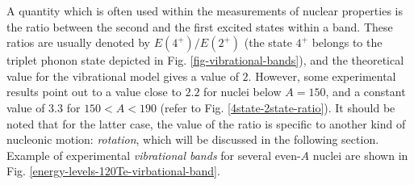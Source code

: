 A quantity which is often used within the measurements of nuclear properties is the ratio between the second and the first excited states within a band. These ratios are usually denoted by $E(4^+)/E(2^+)$ (the state $4^+$ belongs to the triplet phonon state depicted in Fig. \ref{fig-vibrational-bands}), and the theoretical value for the vibrational model gives a value of $2$. However, some experimental results point out to a value close to $2.2$ for nuclei below $A=150$, and a constant value of $3.3$ for $150<A<190$ (refer to Fig. \ref{4state-2state-ratio}). It should be noted that for the latter case, the value of the ratio is specific to another kind of nucleonic motion: \emph{rotation}, which will be discussed in the following section.
Example of experimental \emph{vibrational bands} for several even-$A$ nuclei are shown in Fig. \ref{energy-levels-120Te-virbational-band}.

